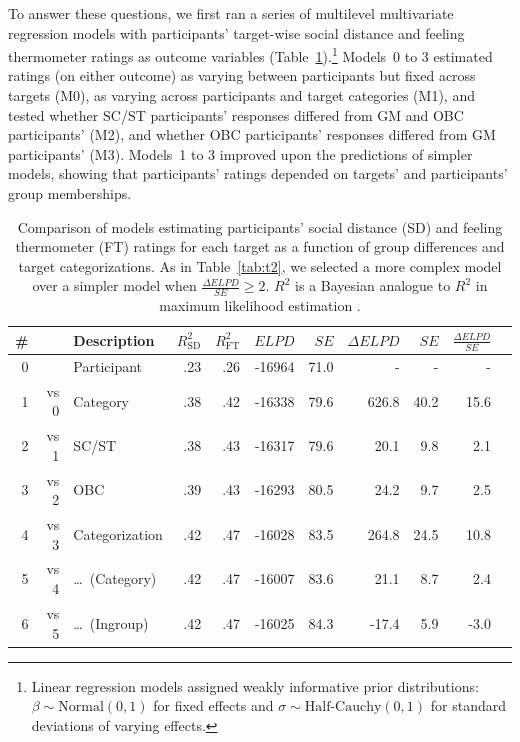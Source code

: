 \documentclass[12pt, a4paper]{article}
\begin{document}
To answer these questions, we first ran a series of multilevel multivariate regression models with participants' target-wise social distance and feeling thermometer ratings as outcome variables (Table~\ref{tab:t3}).\footnote{Linear regression models assigned weakly informative prior distributions: $\beta \sim \text{Normal}(0, 1)$ for fixed effects and $\sigma \sim \text{Half-Cauchy}(0, 1)$ for standard deviations of varying effects.} Models~0 to 3 estimated ratings (on either outcome) as varying between participants but fixed across targets (M0), as varying across participants and target categories (M1), and tested whether SC/ST participants' responses differed from GM and OBC participants' (M2), and whether OBC participants' responses differed from GM participants' (M3). Models~1 to 3 improved upon the predictions of simpler models, showing that participants' ratings depended on targets' and participants' group memberships. 

\begin{table}
\caption{Comparison of models estimating participants' social distance (SD) and feeling thermometer (FT) ratings for each target as a function of group differences and target categorizations. As in Table~\ref{tab:t2}, we selected a more complex model over a simpler model when $\frac{\Delta\textit{ELPD}}{\textit{SE}} \geq 2$. $R^2$ is a Bayesian analogue to $R^2$ in maximum likelihood estimation \protect{}.}
\centering
{}
\small	
\begin{tabularx}{\linewidth}{r@{~}rXrrrrrrrr} \toprule
\# &  & Description & $R^2_\text{SD}$ & $R^2_\text{FT}$ & $\textit{ELPD}$ & $\textit{SE}$ & $\Delta\textit{ELPD}$ & $\textit{SE}$ & $\frac{\Delta\textit{ELPD}}{\textit{SE}}$ \\ \midrule 
0 &      & Participant & .23 & .26 & -16964 & 71.0 & - & - & - \\
1 & vs 0 & Category & .38 & .42 & -16338 & 79.6 & 626.8 & 40.2 & 15.6 \\
2 & vs 1 & SC/ST    & .38 & .43 & -16317 & 79.6 &  20.1 &  9.8 &  2.1 \\
3 & vs 2 & OBC      & .39 & .43 & -16293 & 80.5 &  24.2 &  9.7 &  2.5 \\ \midrule
4 & vs 3 & Categorization    & .42 & .47 & -16028 & 83.5 & 264.8 & 24.5 & 10.8 \\
5 & vs 4 & \ldots~(Category) & .42 & .47 & -16007 & 83.6 &  21.1 &  8.7 &  2.4 \\
6 & vs 5 & \ldots~(Ingroup)  & .42 & .47 & -16025 & 84.3 & -17.4 &  5.9 & -3.0 \\
\bottomrule    
\end{tabularx}
\label{tab:t3}
\end{table}
\end{document}
